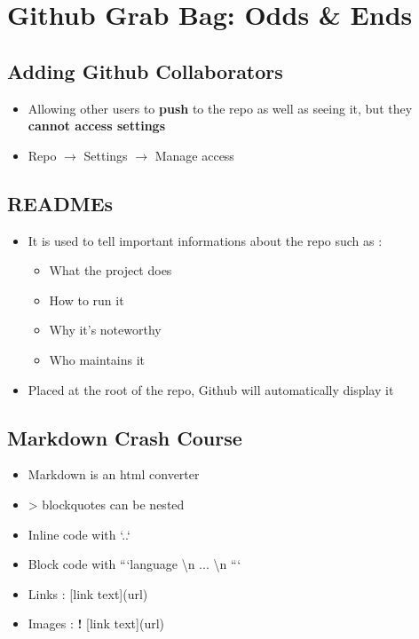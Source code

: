 \documentclass{report}
\begin{document}
\chapter{Github Grab Bag: Odds \& Ends}


\section{Adding Github Collaborators}

\begin{itemize}
	\item Allowing other users to \textbf{push} to the repo as well as seeing it, but they \textbf{cannot access settings} 
	\item Repo $\rightarrow$ Settings $\rightarrow$ Manage access
\end{itemize}


\section{READMEs}

\begin{itemize}
	\item It is used to tell important informations about the repo such as :
		\begin{itemize}
			\item What the project does 
			\item How to run it 
			\item Why it's noteworthy 
			\item Who maintains it
		\end{itemize}
	\item Placed at the root of the repo, Github will automatically display it
\end{itemize}


\section{Markdown Crash Course}

\begin{itemize}
	\item Markdown is an html converter 
	\item > blockquotes can be nested 
	\item Inline code with `..` 
	\item Block code with ```language \textbackslash n ... \textbackslash n ``` 
	\item Links : [link text](url)
	\item Images : \textbf{!} [link text](url)
\end{itemize}
\end{document}
